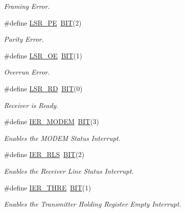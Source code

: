 \begin{DoxyCompactItemize}
\begin{DoxyCompactList}\small\item\em Framing Error. \end{DoxyCompactList}\item 
\#define \hyperlink{group___serial_ga0ee28cdbc0917173f06cc39527452a8f}{L\+S\+R\+\_\+\+PE}~\hyperlink{group___serial_ga3a8ea58898cb58fc96013383d39f482c}{B\+IT}(2)
\begin{DoxyCompactList}\small\item\em Parity Error. \end{DoxyCompactList}\item 
\#define \hyperlink{group___serial_gae844dd49bb0e0770bcf46ad5bfe20973}{L\+S\+R\+\_\+\+OE}~\hyperlink{group___serial_ga3a8ea58898cb58fc96013383d39f482c}{B\+IT}(1)
\begin{DoxyCompactList}\small\item\em Overrun Error. \end{DoxyCompactList}\item 
\#define \hyperlink{group___serial_gaef6b74ebb13843a65360fd9150bfe60f}{L\+S\+R\+\_\+\+RD}~\hyperlink{group___serial_ga3a8ea58898cb58fc96013383d39f482c}{B\+IT}(0)
\begin{DoxyCompactList}\small\item\em Receiver is Ready. \end{DoxyCompactList}\item 
\#define \hyperlink{group___serial_gae06fe45719e515d431ec3b0e9356516d}{I\+E\+R\+\_\+\+M\+O\+D\+EM}~\hyperlink{group___serial_ga3a8ea58898cb58fc96013383d39f482c}{B\+IT}(3)
\begin{DoxyCompactList}\small\item\em Enables the M\+O\+D\+EM Status Interrupt. \end{DoxyCompactList}\item 
\#define \hyperlink{group___serial_gaec947c63128590c8f615862ee9c2c953}{I\+E\+R\+\_\+\+R\+LS}~\hyperlink{group___serial_ga3a8ea58898cb58fc96013383d39f482c}{B\+IT}(2)
\begin{DoxyCompactList}\small\item\em Enables the Receiver Line Status Interrupt. \end{DoxyCompactList}\item 
\#define \hyperlink{group___serial_ga22682c3d4571d7a79ed0ca2bc88a15a6}{I\+E\+R\+\_\+\+T\+H\+RE}~\hyperlink{group___serial_ga3a8ea58898cb58fc96013383d39f482c}{B\+IT}(1)
\begin{DoxyCompactList}\small\item\em Enables the Transmitter Holding Register Empty Interrupt. \end{DoxyCompactList}\item 

\end{DoxyCompactItemize}

